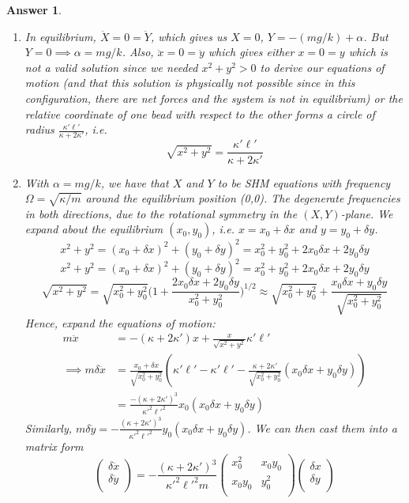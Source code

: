 \documentclass[a4paper]{article}
\newtheorem{ans}{Answer}[section]
\theoremstyle{new}
\begin{document}
\begin{ans}
\begin{enumerate}[label=(\alph*)]
\item In equilibrium, $\ddot{X}=0=\ddot{Y}$, which gives us $X=0$, $Y=-(mg/k)+\alpha$. But $Y=0\implies\alpha=mg/k$. Also, $\ddot{x}=0=\ddot{y}$ which gives either $x=0=y$ which is not a valid solution since we needed $x^2+y^2>0$ to derive our equations of motion (and that this solution is physically not possible since in this configuration, there are net forces and the system is not in equilibrium) or the relative coordinate of one bead with respect to the other forms a circle of radius $\frac{\kappa'\ell'}{\kappa+2\kappa'}$, i.e.
$$\sqrt{x^2+y^2}=\frac{\kappa'\ell'}{\kappa+2\kappa'}$$
\item With $\alpha=mg/k$, we have that $X$ and $Y$ to be SHM equations with frequency $\Omega=\sqrt{\kappa/m}$ around the equilibrium position (0,0). The degenerate frequencies in both directions, due to the rotational symmetry in the $(X,Y)$-plane. We expand about the equilibrium $(x_0,y_0)$, i.e. $x=x_0+\delta x$ and $y=y_0+\delta y$. 
$$x^2+y^2=(x_0+\delta x)^2+(y_0+\delta y)^2=x_0^2+y_0^2+2x_0\delta x+2y_0\delta y$$
$$x^2+y^2=(x_0+\delta x)^2+(y_0+\delta y)^2=x_0^2+y_0^2+2x_0\delta x+2y_0\delta y$$
$$\sqrt{x^2+y^2}=\sqrt{x_0^2+y_0^2}\bigg(1+\frac{2x_0\delta x+2y_0\delta y}{x_0^2+y_0^2}\bigg)^{1/2}\approx\sqrt{x_0^2+y_0^2}+\frac{x_0\delta x+y_0\delta y}{\sqrt{x_0^2+y_0^2}}$$
Hence, expand the equations of motion:
\begin{align}
m\ddot{x}&=-(\kappa+2\kappa')x+\frac{x}{\sqrt{x^2+y^2}}\kappa'\ell'\nonumber\\\implies m\delta\ddot{x}&=\frac{x_0+\delta x}{\sqrt{x_0^2+y_0^2}}(\kappa'\ell'-\kappa'\ell'-\frac{\kappa+2\kappa'}{\sqrt{x_0^2+y_0^2}}(x_0\delta x+y_0\delta y))\nonumber\\&=\frac{-(\kappa+2\kappa')^3}{\kappa'^2\ell'^2}x_0(x_0\delta x+y_0\delta y)\nonumber
\end{align}
Similarly, $m\delta\ddot{y}=-\frac{(\kappa+2\kappa')^3}{\kappa'^2\ell'^2}y_0(x_0\delta x+y_0\delta y)$. We can then cast them into a matrix form
$$\begin{pmatrix}\delta\ddot{x}\\\delta\ddot{y}\\\end{pmatrix}=-\frac{(\kappa+2\kappa')^3}{\kappa'^2\ell'^2m}\begin{pmatrix}x_0^2&x_0y_0\\x_0y_0&y_0^2\\\end{pmatrix}\begin{pmatrix}\delta x\\\delta y\\\end{pmatrix}$$

\end{enumerate}
\end{ans}
\end{document}
